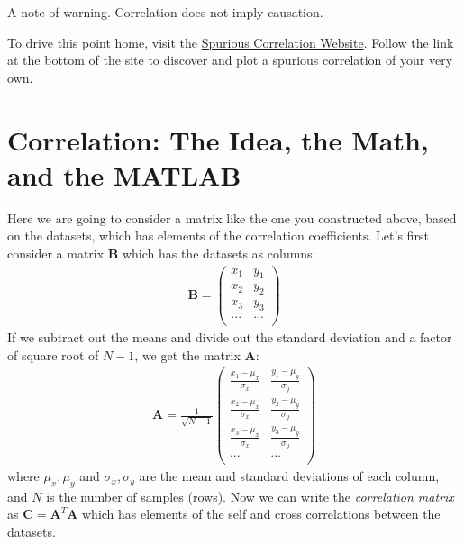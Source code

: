 A note of warning.  Correlation does not imply causation.
\begin{prob}
To drive this point home, visit the \href{http://tylervigen.com/spurious-correlations}{Spurious Correlation Website}.  Follow the link at the bottom of the site to discover and plot a spurious correlation of your very own.
\end{prob}

\section{Correlation: The Idea, the Math, and the MATLAB}
Here we are going to consider a matrix like the one you constructed above, based on the datasets, which has elements of the correlation coefficients.  Let's first consider a matrix $\mathbf{B}$ which has the datasets as columns:
\begin{align*}
\mathbf{B} =  \begin{pmatrix}
    x_1 & y_1\\
    x_2 & y_2 \\
    x_3 & y_3\\
    ...&...\\
  \end{pmatrix}
\end{align*}
If we subtract out the means and divide out the standard deviation and a factor of square root of $N-1$, we get the matrix $\mathbf{A}$:
\begin{align*}
\mathbf{A} = \frac{1}{\sqrt{N-1}} \begin{pmatrix}
    \frac{x_1-\mu_x}{\sigma_x} & \frac{y_1-\mu_y}{\sigma_y}\\
   \frac{x_2-\mu_x}{\sigma_x} &  \frac{y_2-\mu_y}{\sigma_y}\\
    \frac{x_3-\mu_x}{\sigma_x} & \frac{y_3-\mu_y}{\sigma_y}\\
    ...&...\\
  \end{pmatrix}
\end{align*}
where $\mu_x,\mu_y$ and $\sigma_x,\sigma_y$  are the mean  and standard deviations of each column, and $N$ is the number of samples (rows).  Now we
can write the \textit{correlation matrix} as $\mathbf{C} = \mathbf{A}^T \mathbf{A}$ which has elements of the self and cross correlations between the datasets.

